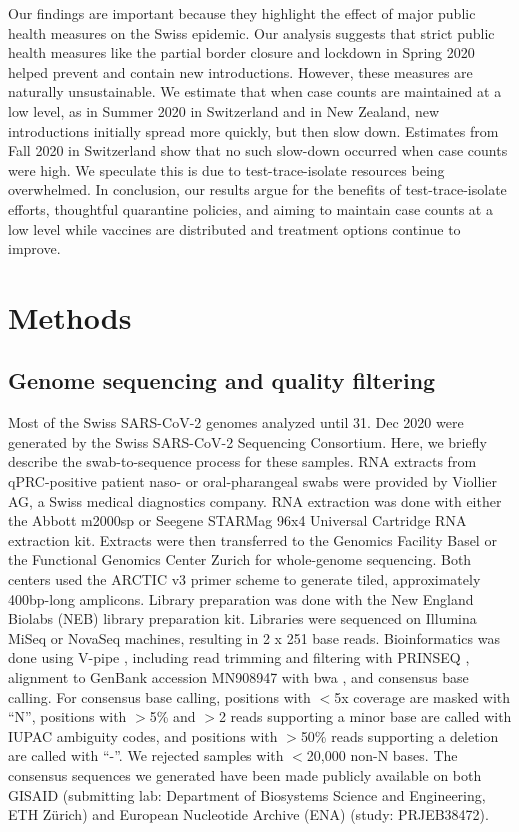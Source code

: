 \documentclass[9pt,twoside,lineno]{pnas-new} %
\begin{document}
Our findings are important because they highlight the effect of major public health measures on the Swiss epidemic. Our analysis suggests that strict public health measures like the partial border closure and lockdown in Spring 2020 helped prevent and contain new introductions. However, these measures are naturally unsustainable. We estimate that when case counts are maintained at a low level, as in Summer 2020 in Switzerland and in New Zealand, new introductions initially spread more quickly, but then slow down. Estimates from Fall 2020 in Switzerland show that no such slow-down occurred when case counts were high. We speculate this is due to test-trace-isolate resources being overwhelmed. In conclusion, our results argue for the benefits of test-trace-isolate efforts, thoughtful quarantine policies, and aiming to maintain case counts at a low level while vaccines are distributed and treatment options continue to improve.

\section{Methods}
\subsection*{Genome sequencing and quality filtering}
Most of the Swiss SARS-CoV-2 genomes analyzed until 31. Dec 2020 were generated by the Swiss SARS-CoV-2 Sequencing Consortium. Here, we briefly describe the swab-to-sequence process for these samples. RNA extracts from qPRC-positive patient naso- or oral-pharangeal swabs were provided by Viollier AG, a Swiss medical diagnostics company. RNA extraction was done with either the Abbott m2000sp or Seegene STARMag 96x4 Universal Cartridge RNA extraction kit. Extracts were then  transferred to the Genomics Facility Basel or the Functional Genomics Center Zurich for whole-genome sequencing. Both centers used the ARCTIC v3 primer scheme \cite{Quick2017, ARCTICNetwork} to generate tiled, approximately 400bp-long amplicons. Library preparation was done with the New England Biolabs (NEB) library preparation kit. Libraries were sequenced on Illumina MiSeq or NovaSeq machines, resulting in 2 x 251 base reads. Bioinformatics was done using V-pipe \cite{Posada-Cespedes2020}, including read trimming and filtering with PRINSEQ \cite{Schmieder2011}, alignment to GenBank accession MN908947 \cite{Wu2020} with bwa \cite{Li2009}, and consensus base calling. For consensus base calling, positions with $<$5x coverage are masked with ``N'', positions with $>$5\% and $>$2 reads supporting a minor base are called with IUPAC ambiguity codes, and positions with $>$50\% reads supporting a deletion are called with ``-''. We rejected samples with $<$20,000 non-N bases. The consensus sequences we generated have been made publicly available on both GISAID (submitting lab: Department of Biosystems Science and Engineering, ETH Zürich) and European Nucleotide Archive (ENA) (study: PRJEB38472).
\end{document}
